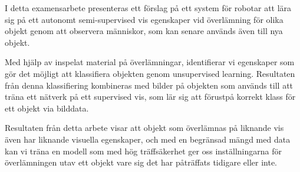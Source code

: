 I detta examensarbete presenteras ett förslag på ett system för robotar att lära sig på ett autonomt semi-supervised vis egenskaper vid överlämning för olika objekt genom att observera människor, som kan senare används även till nya objekt.

Med hjälp av inspelat material på överlämningar, identifierar vi egenskaper som gör det möjligt att klassifiera objekten genom unsupervised learning. Resultaten från denna klassifiering kombineras med bilder på objekten som används till att träna ett nätverk på ett supervised vis, som lär sig att förustpå korrekt klass för ett objekt via bilddata.

Resultaten från detta arbete visar att objekt som överlämnas på liknande vis även har liknande visuella egenskaper, och med en begränsad mängd med data kan vi träna en modell som med hög träffsäkerhet ger oss inställningarna för överlämningen utav ett objekt vare sig det har påträffats tidigare eller inte.
